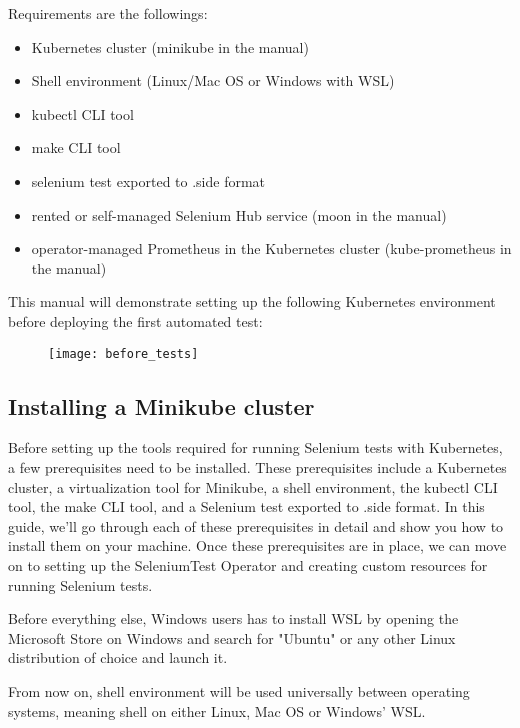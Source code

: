 Requirements are the followings:
\begin{itemize}
	\item Kubernetes cluster (minikube in the manual)
	\item Shell environment (Linux/Mac OS or Windows with WSL)
	\item kubectl CLI tool
	\item make CLI tool
	\item selenium test exported to .side format
	\item rented or self-managed Selenium Hub service (moon in the manual) 
	\item operator-managed Prometheus in the Kubernetes cluster (kube-prometheus in the manual)
\end{itemize}

This manual will demonstrate setting up the following Kubernetes environment before deploying the first automated test:

\begin{figure}[H]
	\centering
	\texttt{[image: before\_tests]}
	\label{fig:before_tests}
\end{figure}

\subsection{Installing a Minikube cluster}

Before setting up the tools required for running Selenium tests with Kubernetes, a few prerequisites need to be installed. These prerequisites include a Kubernetes cluster, a virtualization tool for Minikube, a shell environment, the kubectl CLI tool, the make CLI tool, and a Selenium test exported to .side format. In this guide, we'll go through each of these prerequisites in detail and show you how to install them on your machine. Once these prerequisites are in place, we can move on to setting up the SeleniumTest Operator and creating custom resources for running Selenium tests.

Before everything else, Windows users has to install WSL by opening the Microsoft Store on Windows and search for "Ubuntu" or any other Linux distribution of choice and launch it.

From now on, shell environment will be used universally between operating systems, meaning shell on either Linux, Mac OS or Windows' WSL.

